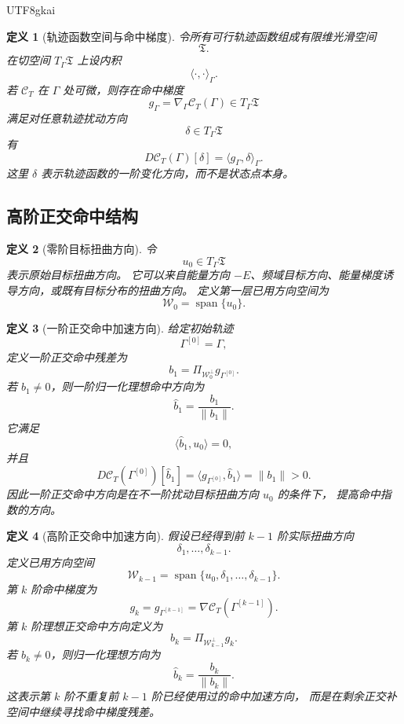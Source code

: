 \documentclass[12pt]{article}
\newtheorem{definition}{定义}[section]
\begin{document}
\begin{CJK*}{UTF8}{gkai}
\begin{definition}[轨迹函数空间与命中梯度]
\label{def:tex55-jacgap-trajectory-gradient}
令所有可行轨迹函数组成有限维光滑空间
\[
  \mathfrak T.
\]
在切空间 \(T_\Gamma\mathfrak T\) 上设内积
\[
  \langle\cdot,\cdot\rangle_\Gamma.
\]
若 \(\mathcal C_T\) 在 \(\Gamma\) 处可微，则存在命中梯度
\[
  g_\Gamma
  =
  \nabla_\Gamma\mathcal C_T(\Gamma)
  \in T_\Gamma\mathfrak T
\]
满足对任意轨迹扰动方向
\[
  \delta\in T_\Gamma\mathfrak T
\]
有
\[
  D\mathcal C_T(\Gamma)[\delta]
  =
  \langle g_\Gamma,\delta\rangle_\Gamma.
\]
这里 \(\delta\) 表示轨迹函数的一阶变化方向，而不是状态点本身。
\end{definition}

\subsection{高阶正交命中结构}
\label{subsec:tex55-jacgap-orthogonal-structure}

\begin{definition}[零阶目标扭曲方向]
\label{def:tex55-jacgap-zero-target}
令
\[
  u_0\in T_\Gamma\mathfrak T
\]
表示原始目标扭曲方向。
它可以来自能量方向 \(-E\)、频域目标方向、能量梯度诱导方向，或既有目标分布的扭曲方向。
定义第一层已用方向空间为
\[
  \mathcal W_0
  =
  \operatorname{span}\{u_0\}.
\]
\end{definition}

\begin{definition}[一阶正交命中加速方向]
\label{def:tex55-jacgap-first-order-direction}
给定初始轨迹
\[
  \Gamma^{[0]}=\Gamma,
\]
定义一阶正交命中残差为
\[
  b_1
  =
  \Pi_{\mathcal W_0^\perp}
  g_{\Gamma^{[0]}}.
\]
若 \(b_1\neq0\)，则一阶归一化理想命中方向为
\[
  \widehat b_1
  =
  \frac{b_1}{\lVert b_1\rVert}.
\]
它满足
\[
  \langle \widehat b_1,u_0\rangle=0,
\]
并且
\[
  D\mathcal C_T(\Gamma^{[0]})[\widehat b_1]
  =
  \langle g_{\Gamma^{[0]}},\widehat b_1\rangle
  =
  \lVert b_1\rVert
  >
  0.
\]
因此一阶正交命中方向是在不一阶扰动目标扭曲方向 \(u_0\) 的条件下，
提高命中指数的方向。
\end{definition}

\begin{definition}[高阶正交命中加速方向]
\label{def:tex55-jacgap-higher-order-direction}
假设已经得到前 \(k-1\) 阶实际扭曲方向
\[
  \delta_1,\ldots,\delta_{k-1}.
\]
定义已用方向空间
\[
  \mathcal W_{k-1}
  =
  \operatorname{span}\{u_0,\delta_1,\ldots,\delta_{k-1}\}.
\]
第 \(k\) 阶命中梯度为
\[
  g_k
  =
  g_{\Gamma^{[k-1]}}
  =
  \nabla\mathcal C_T(\Gamma^{[k-1]}).
\]
第 \(k\) 阶理想正交命中方向定义为
\[
  b_k
  =
  \Pi_{\mathcal W_{k-1}^{\perp}}g_k.
\]
若 \(b_k\neq0\)，则归一化理想方向为
\[
  \widehat b_k
  =
  \frac{b_k}{\lVert b_k\rVert}.
\]
这表示第 \(k\) 阶不重复前 \(k-1\) 阶已经使用过的命中加速方向，
而是在剩余正交补空间中继续寻找命中梯度残差。
\end{definition}


\end{CJK*}
\end{document}
